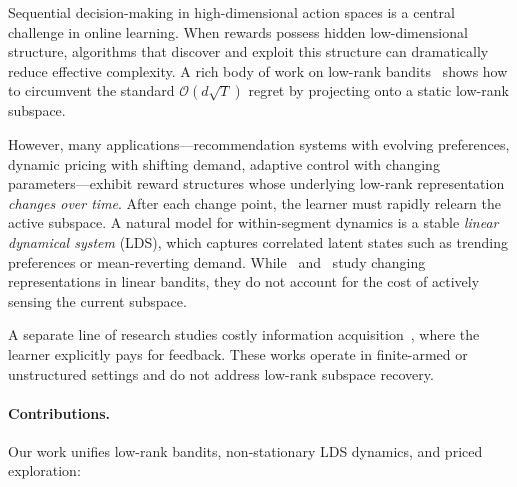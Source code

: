 \documentclass{article}
\begin{document}
Sequential decision-making in high-dimensional action spaces is a central challenge in online learning.
When rewards possess hidden low-dimensional structure, algorithms that discover and exploit this structure can dramatically reduce effective complexity.
A rich body of work on low-rank bandits~\citep{jun2019bilinear,jedra2024low,lu2021lowrank} shows how to circumvent the standard $\mathcal{O}(d\sqrt{T})$ regret by projecting onto a static low-rank subspace.

However, many applications---recommendation systems with evolving preferences, dynamic pricing with shifting demand, adaptive control with changing parameters---exhibit reward structures whose underlying low-rank representation \emph{changes over time}.
After each change point, the learner must rapidly relearn the active subspace.
A natural model for within-segment dynamics is a stable \emph{linear dynamical system} (LDS), which captures correlated latent states such as trending preferences or mean-reverting demand.
While~\citet{he2022nonstationary} and~\citet{qin2022nonstationary} study changing representations in linear bandits, they do not account for the cost of actively sensing the current subspace.

A separate line of research studies costly information acquisition~\citep{seldin2014paid,tucker2023costly,elumar2025costly}, where the learner explicitly pays for feedback.
These works operate in finite-armed or unstructured settings and do not address low-rank subspace recovery.

\paragraph{Contributions.}
Our work unifies low-rank bandits, non-stationary LDS dynamics, and priced exploration:
\end{document}
